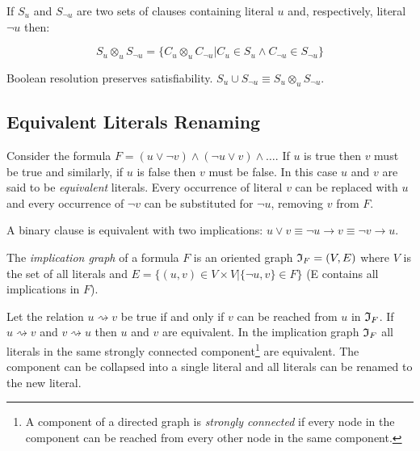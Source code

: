 \begin{mydef}
  If $S_u$ and $S_{\neg u}$ are two sets of clauses containing
  literal $u$ and, respectively, literal $\neg u$ then:

  $$S_u \otimes_{u} S_{\neg u} = \{ C_u \otimes_{u} C_{\neg u} |
  C_u \in S_u \land C_{\neg u} \in S_{\neg u}\}$$
\end{mydef}

\begin{myprop}
  Boolean resolution preserves satisfiability. $S_u \cup S_{\neg u}
  \equiv S_u \otimes_{u} S_{\neg u}$.
\end{myprop}

\subsection{Equivalent Literals Renaming}
\label{ssec:eqlr}

Consider the formula $F = (u \lor \neg v) \land (\neg u \lor v) \land \ldots$.
If $u$ is true then $v$ must be true and similarly, if $u$ is false
then $v$ must be false. In this case $u$ and $v$ are said to be
\emph{equivalent} literals. Every occurrence of literal $v$ can be
replaced with $u$ and every occurrence of $\neg v$ can be
substituted for $\neg u$, removing $v$ from $F$.

\begin{myprop}
  A binary clause is equivalent with two implications:
  $u \lor v \equiv \neg u \rightarrow v \equiv \neg v \rightarrow u$.
\end{myprop}

\begin{mydef}
  The \emph{implication graph} of a formula $F$ is an oriented graph
  $\mathfrak{I}_F = (V, E)$ where $V$ is the set of all literals and $E = \{(u,
  v) \in V \times V | \{\neg u, v\} \in F\}$ (E contains all implications in $F$).
\end{mydef}

Let the relation $u \rightsquigarrow v$ be true if and only if
$v$ can be reached from $u$ in $\mathfrak{I}_F$.  If $u \rightsquigarrow v$
and $v \rightsquigarrow u$ then $u$ and $v$ are equivalent.  In the
implication graph $\mathfrak{I}_F$ all literals in the same strongly connected
component\footnote{A component of a directed graph is \emph{strongly
connected} if every node in the component can be reached from every
other node in the same component.} are equivalent. The component
can be collapsed into a single literal and all literals can be
renamed to the new literal.

